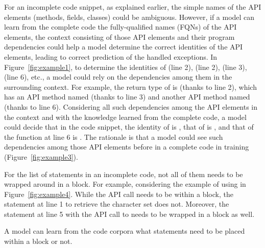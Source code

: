 For an incomplete code snippet, as explained earlier, the simple names
of the API elements (methods, fields, classes) could be ambiguous.
However, if a model can learn from the complete code the
fully-qualified names (FQNs) of the API elements, the context
consisting of those API elements and their program dependencies
could help a model determine the correct identities of the API
elements, leading to correct prediction of the handled exceptions.
%
In Figure~\ref{fig:example1}, to determine the identities of
 (line 2),  (line 2),
 (line 3),  (line 6), etc., a model
could rely on the dependencies among them in the surrounding context.
For example, the return type of  is
 (thanks to line 2), which has an API method named
 (thanks to line 3) and another API method named
 (thanks to line 6). Considering all such dependencies among
the API elements in the context and with the knowledge learned from
the complete code, a model could decide that in the code snippet, the identity of
 is , that of
 is
, and that of the
 function at line 6 is
. The rationale is that a
model could see such dependencies among those API elements before in
a complete code in training (Figure~\ref{fig:example3}).



For the list of statements in an incomplete code, not all of them
needs to be wrapped around in a  block. For example,
considering the example of using  in
Figure~\ref{fig:example4}. While the API call
 needs to be within a
 block, the statement at line 1 to retrieve the
character set does not. Moreover, the statement at line 5 with the API
call to  needs to be wrapped in a 
block as well.






\begin{Observation} 
\label{ob5}
  A model can learn from the code corpora what statements need to be placed
  within a  block or not.
\end{Observation}
